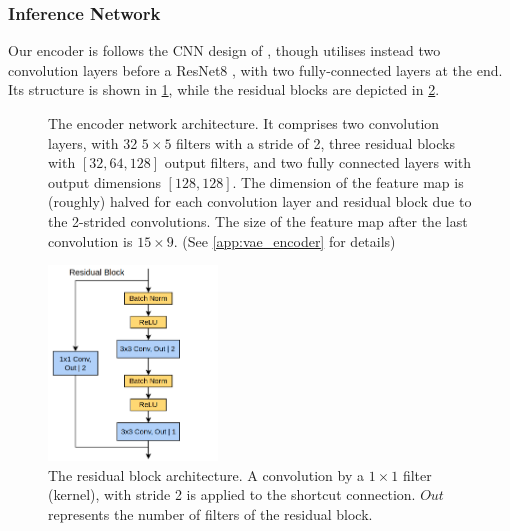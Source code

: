 \subsubsection{Inference Network}
\label{subsubsec:5_vae_inference_network}
Our encoder is follows the CNN design of \cite{deepCollisionPredictorOracle}, though utilises instead two convolution layers before a ResNet8 \cite{KaimingResNet}, with two fully-connected layers at the end. Its structure is shown in \cref{fig:5_encoder}, while the residual blocks are depicted in \cref{fig:5_res_block}.
\begin{figure}[H]
    \centering
    \caption{The encoder network architecture. It comprises two convolution layers, with 32 $5\times5$ filters with a stride of 2, three residual blocks with $[32, 64, 128]$ output filters, and two fully connected layers with output dimensions $[128, 128]$. The dimension of the feature map is (roughly) halved for each convolution layer and residual block due to the 2-strided convolutions. The size of the feature map after the last convolution is $15\times9$. (See \cref{app:vae_encoder} for details)}
    \label{fig:5_encoder}
\end{figure}
\begin{figure}[H]
    \centering
    \includegraphics[width=0.4\textwidth]{figures/5_/5_res_block.png}
    \caption{The residual block architecture. A convolution by a $1\times1$ filter (kernel), with stride 2 is applied to the shortcut connection. $Out$ represents the number of filters of the residual block.}
    \label{fig:5_res_block}
\end{figure}
